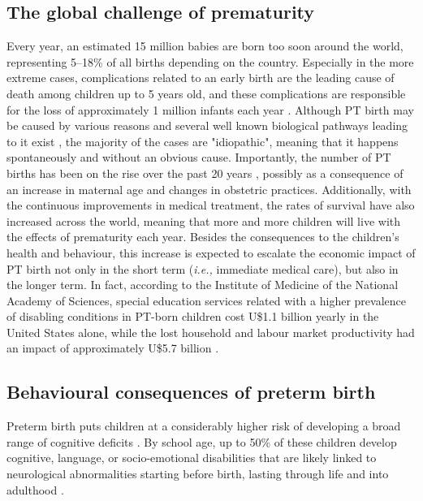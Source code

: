 \subsection{The global challenge of prematurity}

Every year, an estimated 15 million babies are born too soon around the world, representing 5–18\% of all births depending on the country. 
Especially in the more extreme cases, complications related to an early birth are the leading cause of death among children up to 5 years old, and these complications are responsible for the loss of approximately 1 million infants each year \citep{Liu2016}. 
Although PT birth may be caused by various reasons and several well known biological pathways leading to it exist \citep{Behrman2007}, the majority of the cases are "idiopathic", meaning that it happens spontaneously and without an obvious cause.
Importantly, the number of PT births has been on the rise over the past 20 years \citep{Costeloe2012}, possibly as a consequence of  an increase in maternal age and changes in obstetric practices. 
Additionally, with the continuous improvements in medical treatment, the rates of survival have also increased across the world, meaning that more and more children will live with the effects of prematurity each year. 
Besides the consequences to the children's health and behaviour, this increase is expected to escalate the economic impact of PT birth not only in the short term (\textit{i.e.,} immediate medical care), but also in the longer term. 
In fact, according to the Institute of Medicine of the National Academy of Sciences, special education services related with a higher prevalence of disabling conditions in PT-born children cost U\$1.1 billion yearly in the United States alone, while the lost household and labour market productivity had an impact of approximately U\$5.7 billion \citep{Behrman2007}. %





\subsection{Behavioural consequences of preterm birth}

Preterm birth puts children at a considerably higher risk of developing a broad range of cognitive deficits \citep{Brydges2018, Twilhaar2018}. %
By school age, up to 50\% of these children develop cognitive, language, or socio-emotional disabilities that are likely linked to neurological abnormalities starting before birth, lasting through life and into adulthood \citep{Gozzo2009, Chaminade2013, Moiseev2014, Hornman2016, Thomason2017, Burnett2018}.

